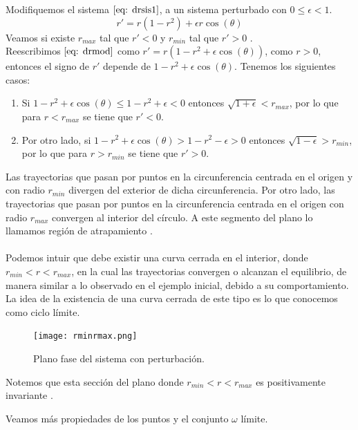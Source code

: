 Modifiquemos el sistema $\eqref{eq: drsis1}$, a un sistema perturbado
con $0\leq\epsilon<1$.
\begin{equation}\label{eq: drmod}
	r'=r(1-r^2)+\epsilon r\cos(\theta)
\end{equation}
Veamos si existe $r_{max}$ tal que $r'<0$ y $r_{min}$ tal que $r'>0$ \cite{bender2013advanced}.\\

Reescribimos $\eqref{eq: drmod}$ como $r'=r(1-r^2+\epsilon \cos(\theta))$, como $r>0$,
entonces el signo de $r'$ depende de $1-r^2+\epsilon \cos(\theta)$.
Tenemos los siguientes casos:

\begin{enumerate}
	\item Si $1-r^2+\epsilon\cos(\theta)\leq 1-r^2+\epsilon<0$
	      entonces $\sqrt{1+\epsilon}<r_{max}$, por lo que para $r<r_{max}$ se tiene que $r'<0$.
	\item Por otro lado, si	$1-r^2+\epsilon\cos(\theta)>1-r^2-\epsilon>0$
	      entonces $\sqrt{1-\epsilon}>r_{min}$, por lo que para $r>r_{min}$ se tiene que $r'>0$.
\end{enumerate}

Las trayectorias que pasan por puntos en la circunferencia centrada
en el origen y con radio $r_{min}$
divergen del exterior de dicha circunferencia. Por otro lado,
las trayectorias que pasan por puntos en la circunferencia centrada
en el origen con radio $r_{max}$
convergen al interior del círculo.
A este segmento del plano lo llamamos región de atrapamiento \cite{hinch1991perturbation}.\\
\\Podemos intuir que debe existir
una curva cerrada en el interior, donde $r_{min}<r<r_{max}$, en la cual
las trayectorias convergen o alcanzan el equilibrio, de manera similar
a lo observado en el ejemplo
inicial, debido a su comportamiento. La idea de la existencia de una
curva cerrada de este tipo es lo que conocemos como ciclo límite.\\

\begin{figure}[h]
	\centering
	\texttt{[image: rminrmax.png]}
	\caption{Plano fase del sistema con perturbación.}
\end{figure}

Notemos que esta sección del plano donde $r_{min}<r<r_{max}$ es positivamente invariante \cite{hirsch2012differential}.
\newpage

Veamos más propiedades de los puntos y el conjunto $\omega$ límite.

